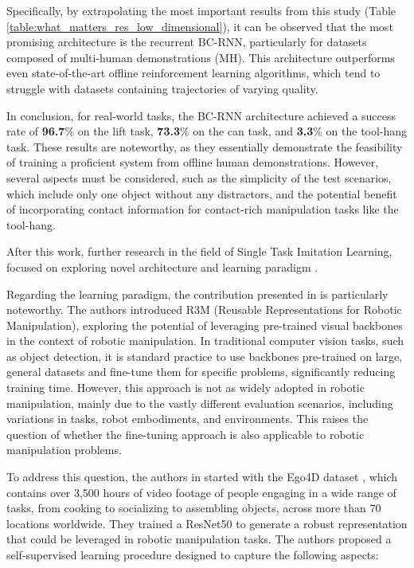 Specifically, by extrapolating the most important results from this study (Table \ref{table:what_matters_res_low_dimensional}), it can be observed that the most promising architecture is the recurrent BC-RNN, particularly for datasets composed of multi-human demonstrations (MH). This architecture outperforms even state-of-the-art offline reinforcement learning algorithms, which tend to struggle with datasets containing trajectories of varying quality.

In conclusion, for real-world tasks, the BC-RNN architecture achieved a success rate of \textbf{96.7}\% on the lift task, \textbf{73.3}\% on the can task, and \textbf{3.3}\% on the tool-hang task. These results are noteworthy, as they essentially demonstrate the feasibility of training a proficient system from offline human demonstrations. However, several aspects must be considered, such as the simplicity of the test scenarios, which include only one object without any distractors, and the potential benefit of incorporating contact information for contact-rich manipulation tasks like the tool-hang.


After this work, further research in the field of Single Task Imitation Learning, focused on exploring novel architecture \cite{shafiullah2022behavior} and learning paradigm \cite{nair2022r3m,cheng2023diffusion,shi2023waypoint}. 

Regarding the learning paradigm, the contribution presented in \cite{nair2022r3m} is particularly noteworthy. The authors introduced R3M (Reusable Representations for Robotic Manipulation), exploring the potential of leveraging pre-trained visual backbones in the context of robotic manipulation. In traditional computer vision tasks, such as object detection, it is standard practice to use backbones pre-trained on large, general datasets and fine-tune them for specific problems, significantly reducing training time. However, this approach is not as widely adopted in robotic manipulation, mainly due to the vastly different evaluation scenarios, including variations in tasks, robot embodiments, and environments. This raises the question of whether the fine-tuning approach is also applicable to robotic manipulation problems.

To address this question, the authors in \cite{nair2022r3m} started with the Ego4D dataset \cite{grauman2022ego4d}, which contains over 3,500 hours of video footage of people engaging in a wide range of tasks, from cooking to socializing to assembling objects, across more than 70 locations worldwide. They trained a ResNet50 \cite{resnet} to generate a robust representation that could be leveraged in robotic manipulation tasks. The authors proposed a self-supervised learning procedure designed to capture the following aspects:

